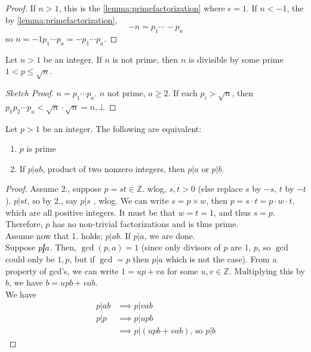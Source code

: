 \documentclass[12pt,oneside]{article}
\begin{document}
\begin{proof}
  If $n > 1$, this is the \cref{lemma:primefactorization} where $\epsilon = 1$. If $n < -1$, the by \cref{lemma:primefactorization}, $$-n = p_1 \cdots -p_n$$ so $n = -1 p_1 \cdots p_a = - p_1 \cdots p_a$.
\end{proof}

\begin{theorem}
  Let $n > 1$ be an integer. If $n$ is not prime, then $n$ is divisible by some prime $1 < p \leq \sqrt{n}$.
\end{theorem}

\begin{proof}[Sketch Proof]
  $n = p_1 \cdots p_a$. $n$ not prime, $a \geq 2$. If each $p_i > \sqrt{n}$, then $p_1 p_2 \cdots p_a < \sqrt{n}\cdot \sqrt{n} = n,\bot$
\end{proof}
  
\begin{lemma}\label{lemma:primediv}
  Let $p>1$ be an integer. The following are equivalent:
  \begin{enumerate}
    \item $p$ is prime
    \item If $p | ab$, product of two nonzero integers, then $p|a$ or $p|b$.
  \end{enumerate}
\end{lemma}

\begin{proof}
  Assume 2., suppose $p = st \in \mathbb{Z}$. wlog, $s,t > 0$ (else replace $s$ by $-s$, $t$ by $-t$). $p|st$, so by 2., say $p|s$ , wlog. We can write $s = p \times w$, then $p = s\cdot t = p\cdot w \cdot t$, which are all positive integers. It must be that $w = t = 1$, and thus $s = p$. Therefore, $p$ has no non-trivial factorizations and is thus prime.\\
  Assume now that 1. holds; $p | ab$. If $p|a$, we are done. 
  \\Suppose $p \cancel{|} a$. Then, $\gcd(p,a) = 1$ (since only divisors of $p$ are 1, $p$, so $\gcd$ could only be $1,  p$, but if $\gcd = p$ then $p|a$ which is not the case). From a property of gcd's, we can write $1 = up + va$ for some $u,v \in \mathbb{Z}$. Multiplying this by $b$, we have $b = upb + vab$.\\
  We have \begin{align*}
    p|ab &\implies p |vab\\
    p|p &\implies p |upb\\
    &\implies p | (upb + vab) \text{, so } p |b
  \end{align*}
\end{proof}
\end{document}

